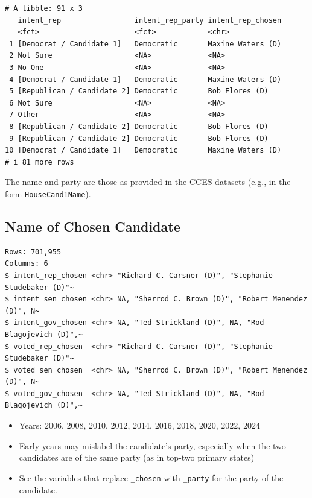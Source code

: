\documentclass[10pt,article,oneside]{memoir}
\begin{document}
\begin{verbatim}
# A tibble: 91 x 3
   intent_rep                 intent_rep_party intent_rep_chosen
   <fct>                      <fct>            <chr>            
 1 [Democrat / Candidate 1]   Democratic       Maxine Waters (D)
 2 Not Sure                   <NA>             <NA>             
 3 No One                     <NA>             <NA>             
 4 [Democrat / Candidate 1]   Democratic       Maxine Waters (D)
 5 [Republican / Candidate 2] Democratic       Bob Flores (D)   
 6 Not Sure                   <NA>             <NA>             
 7 Other                      <NA>             <NA>             
 8 [Republican / Candidate 2] Democratic       Bob Flores (D)   
 9 [Republican / Candidate 2] Democratic       Bob Flores (D)   
10 [Democrat / Candidate 1]   Democratic       Maxine Waters (D)
# i 81 more rows
\end{verbatim}

The name and party are those as provided in the CCES datasets (e.g., in
the form \texttt{HouseCand1Name}).

\subsection{Name of Chosen Candidate}\label{name-of-chosen-candidate}

\begin{verbatim}
Rows: 701,955
Columns: 6
$ intent_rep_chosen <chr> "Richard C. Carsner (D)", "Stephanie Studebaker (D)"~
$ intent_sen_chosen <chr> NA, "Sherrod C. Brown (D)", "Robert Menendez (D)", N~
$ intent_gov_chosen <chr> NA, "Ted Strickland (D)", NA, "Rod Blagojevich (D)",~
$ voted_rep_chosen  <chr> "Richard C. Carsner (D)", "Stephanie Studebaker (D)"~
$ voted_sen_chosen  <chr> NA, "Sherrod C. Brown (D)", "Robert Menendez (D)", N~
$ voted_gov_chosen  <chr> NA, "Ted Strickland (D)", NA, "Rod Blagojevich (D)",~
\end{verbatim}

\begin{itemize}
\tightlist
\item
  Years: 2006, 2008, 2010, 2012, 2014, 2016, 2018, 2020, 2022, 2024
\item
  Early years may mislabel the candidate's party, especially when the
  two candidates are of the same party (as in top-two primary states)
\item
  See the variables that replace \texttt{\_chosen} with \texttt{\_party}
  for the party of the candidate.
\end{itemize}
\end{document}
